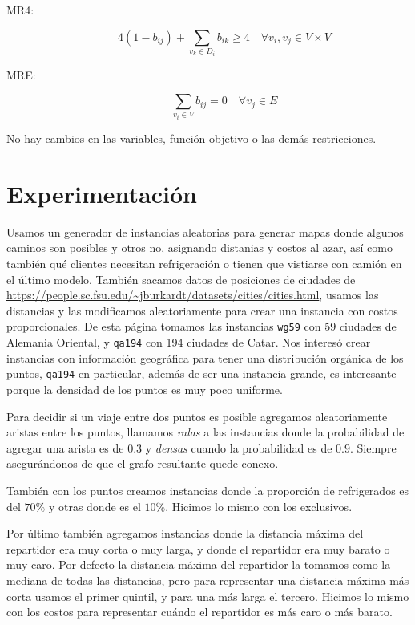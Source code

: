 \documentclass[10pt]{article}
\begin{document}
	\begin{description}
		\item[MR4:]
		\[
		4(1 - b_{ij}) + \sum_{v_k \in D_i} b_{ik} \geq 4 \quad \forall v_i, v_j \in V \times V
		\]
		
		\item[MRE:]
		\[
		\sum_{v_i \in V}  b_{ij} = 0 \quad \forall v_j \in E
		\]
	\end{description}
	
	No hay cambios en las variables, función objetivo o las demás restricciones.


	\section{Experimentación}

	Usamos un generador de instancias aleatorias para generar mapas donde algunos caminos son posibles y otros no, asignando distanias y costos al azar, así como también qué clientes necesitan refrigeración o tienen que vistiarse con camión en el último modelo. También sacamos datos de posiciones de ciudades de \url{https://people.sc.fsu.edu/~jburkardt/datasets/cities/cities.html}, usamos las distancias y las modificamos aleatoriamente para crear una instancia con costos proporcionales. De esta página tomamos las instancias \texttt{wg59} con 59 ciudades de Alemania Oriental, y \texttt{qa194} con 194 ciudades de Catar. Nos interesó crear instancias con información geográfica para tener una distribución orgánica de los puntos, \texttt{qa194} en particular, además de ser una instancia grande, es interesante porque la densidad de los puntos es muy poco uniforme.

	Para decidir si un viaje entre dos puntos es posible agregamos aleatoriamente aristas entre los puntos, llamamos \textit{ralas} a las instancias donde la probabilidad de agregar una arista es de $0.3$ y \textit{densas} cuando la probabilidad es de $0.9$. Siempre asegurándonos de que el grafo resultante quede conexo.

	También con los puntos creamos instancias donde la proporción de refrigerados es del $70\%$ y otras donde es el $10\%$. Hicimos lo mismo con los exclusivos.

	Por último también agregamos instancias donde la distancia máxima del repartidor era muy corta o muy larga, y donde el repartidor era muy barato o muy caro. Por defecto la distancia máxima del repartidor la tomamos como la mediana de todas las distancias, pero para representar una distancia máxima más corta usamos el primer quintil, y para una más larga el tercero. Hicimos lo mismo con los costos para representar cuándo el repartidor es más caro o más barato.
\end{document}
